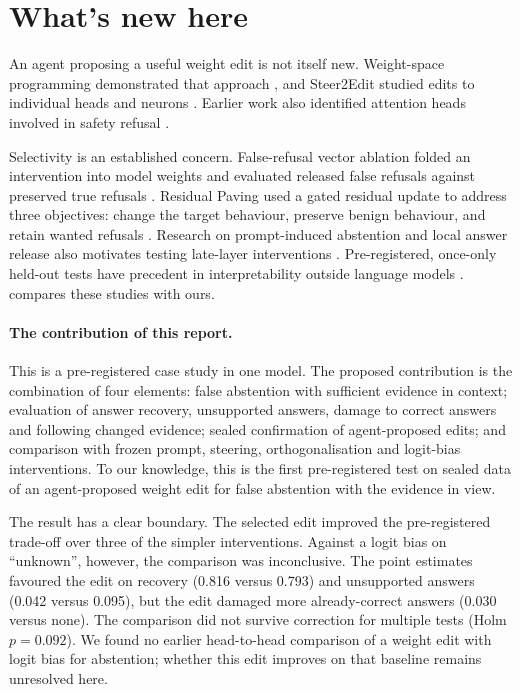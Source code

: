 \section{What's new here}
\label{sec:new}

An agent proposing a useful weight edit is not itself new. Weight-space programming demonstrated that approach
\citep{takehi2026wsp}, and Steer2Edit studied edits to individual heads and neurons \citep{steer2edit2026}.
Earlier work also identified attention heads involved in safety refusal \citep{zhou2025safetyheads}.

Selectivity is an established concern. False-refusal vector ablation folded an intervention into model weights
and evaluated released false refusals against preserved true refusals \citep{wang2025falserefusal}.
Residual Paving used a gated residual update to address three objectives: change the target behaviour, preserve
benign behaviour, and retain wanted refusals \citep{hinkley2026paving}. Research on prompt-induced abstention
and local answer release also motivates testing late-layer interventions
\citep{liu2026broken,ling2025artifact}. Pre-registered, once-only held-out tests have precedent in
interpretability outside language models \citep{readablenotsteerable2026}.
 compares these studies with ours.

\paragraph{The contribution of this report.}
This is a pre-registered case study in one model. The proposed contribution is the combination of four elements:
false abstention with sufficient evidence in context; evaluation of answer recovery, unsupported answers, damage
to correct answers and following changed evidence; sealed confirmation of agent-proposed edits; and comparison
with frozen prompt, steering, orthogonalisation and logit-bias interventions. To our knowledge, this is the first
pre-registered test on sealed data of an agent-proposed weight edit for false abstention with the evidence in view.

The result has a clear boundary. The selected edit improved the pre-registered trade-off over three of the
simpler interventions. Against a logit bias on ``unknown'', however, the comparison was inconclusive. The point
estimates favoured the edit on recovery (0.816 versus 0.793) and unsupported answers (0.042 versus 0.095), but
the edit damaged more already-correct answers (0.030 versus none). The comparison did not survive correction
for multiple tests (Holm $p = 0.092$). We found no earlier head-to-head comparison of a weight edit with logit
bias for abstention; whether this edit improves on that baseline remains unresolved here.
